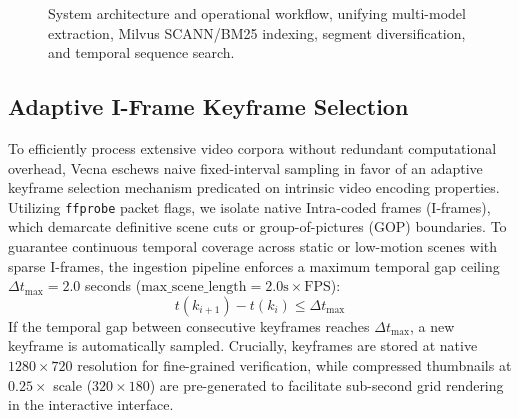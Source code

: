 \begin{figure}[t]
\vspace{-2mm}
\caption{System architecture and operational workflow, unifying multi-model extraction, Milvus SCANN/BM25 indexing, segment diversification, and temporal sequence search.}
\label{fig:architecture}
\vspace{-2mm}
\end{figure}

\subsection{Adaptive I-Frame Keyframe Selection}
To efficiently process extensive video corpora without redundant computational overhead, Vecna eschews naive fixed-interval sampling in favor of an adaptive keyframe selection mechanism predicated on intrinsic video encoding properties. Utilizing \texttt{ffprobe} packet flags, we isolate native Intra-coded frames (I-frames), which demarcate definitive scene cuts or group-of-pictures (GOP) boundaries. To guarantee continuous temporal coverage across static or low-motion scenes with sparse I-frames, the ingestion pipeline enforces a maximum temporal gap ceiling $\Delta t_{\max} = 2.0$ seconds ($\text{max\_scene\_length} = 2.0\text{s} \times \text{FPS}$):
\begin{equation}
    t(k_{i+1}) - t(k_i) \leq \Delta t_{\max}
\end{equation}
If the temporal gap between consecutive keyframes reaches $\Delta t_{\max}$, a new keyframe is automatically sampled. Crucially, keyframes are stored at native $1280 \times 720$ resolution for fine-grained verification, while compressed thumbnails at $0.25\times$ scale ($320 \times 180$) are pre-generated to facilitate sub-second grid rendering in the interactive interface.

